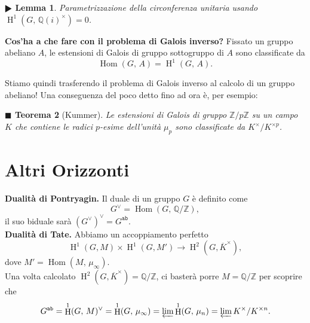 \documentclass[a4paper]{article}
\newtheorem{theorem}{$ \blacksquare $ Teorema}
\newtheorem{lemma}[theorem]{$ \RHD $ Lemma}
\theoremstyle{remark}
\theoremstyle{definition}
\newcommand{\Z}{\mathbb{Z}}
\newcommand{\Q}{\mathbb{Q}}
\DeclareMathOperator{\Hom}{Hom}
\DeclareMathOperator{\HH}{H}
\begin{document}
\begin{lemma}
	Parametrizzazione della circonferenza unitaria usando $ \HH^1(G,\, \Q(i)^\times) = 0 $.\\
\end{lemma}

\textbf{Cos'ha a che fare con il problema di Galois inverso?} Fissato un gruppo abeliano $ A $, le estensioni di Galois di gruppo sottogruppo di $ A $ sono classificate da
\[ \Hom(G,\, A) = \HH^1(G, \, A). \]

Stiamo quindi trasferendo il problema di Galois inverso al calcolo di un gruppo abeliano! Una conseguenza del poco detto fino ad ora è, per esempio:

\begin{theorem}[Kummer]
	Le estensioni di Galois di gruppo $ \Z/p\Z $ su un campo $ K $ che contiene le radici $ p $-esime dell'unità $ \mu_p $ sono classificate da $ K^\times / K^{\times p} $.
\end{theorem}

\section*{Altri Orizzonti}

\textbf{Dualità di Pontryagin.} Il duale di un gruppo $ G $ è definito come
\[ G^\vee = \Hom(G, \, \Q/\Z), \]
il suo biduale sarà $ (G^\vee)^\vee = G^{\texttt{ab}} $. \\

\textbf{Dualità di Tate.} Abbiamo un accoppiamento perfetto
\[ \HH^1(G, M) \times \HH^1(G, M') \to \HH^2(G, \overline{K}^\times), \]
dove $ M' = \Hom(M, \,\mu_\infty) $. \\

Una volta calcolato $ \HH^2(G, \overline{K}^\times) = \Q / \Z $, ci basterà porre $ M = \Q/\Z $ per scoprire che 
\[ G^\texttt{ab} = \HH^1(G, \, M)^\vee = \HH^1(G, \, \mu_\infty) = \varprojlim \HH^1(G, \, \mu_n ) = \varprojlim K^\times / K^{\times n}. \]
\end{document}
